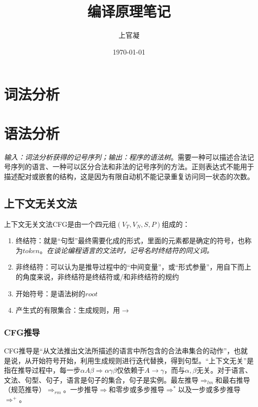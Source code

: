 \documentclass[]{report}
\title{{\huge {编译原理笔记}}}
\author{上官凝}
\date{\today}
\begin{document}
\theoremstyle{definition} \newtheorem{theorem}{Thm}[section] %
\theoremstyle{definition} \newtheorem{definition}{Def}[section] %
\theoremstyle{plain} \newtheorem{lemma}{lemma}[section] %

	\maketitle
	\newpage

	\tableofcontents
	\newpage

	\chapter{词法分析}
	\chapter{语法分析}
	\textit{输入：词法分析获得的记号序列；输出：程序的语法树}。需要一种可以描述合法记号序列的语言、一种可以区分合法和非法的记号序列的方法。正则表达式不能用于描述配对或嵌套的结构，这是因为有限自动机不能记录重复访问同一状态的次数。\par
	\section{上下文无关文法}
		上下文无关文法CFG是由一个四元组$(V_T,V_N,S,P)$组成的：
		\begin{enumerate}
			\item 终结符：就是“句型”最终需要化成的形式，里面的元素都是确定的符号，也称为$token$。\textit{在谈论编程语言的文法时，记号名时终结符的同义词。}
			\item 非终结符：可以认为是推导过程中的“中间变量”，或“形式参量”，用自下而上的角度来说，非终结符是终结符或/和非终结符的规约
			\item 开始符号：是语法树的$root$
			\item 产生式的有限集合：生成规则，用$\to$
		\end{enumerate}
		\subsection{CFG推导}
		CFG推导是“从文法推出文法所描述的语言中所包含的合法串集合的动作”，也就是说，从开始符号开始，利用生成规则进行迭代替换，得到句型。“上下文无关”是指在推导过程中，每一步$\alpha A\beta\Rightarrow\alpha\gamma\beta$仅依赖于$A\to\gamma$，而与$\alpha,\beta$无关。对于语言、文法、句型、句子，语言是句子的集合，句子是实例。最左推导$\Rightarrow_{lm}$和最右推导（规范推导）$\Rightarrow_{rm}$。一步推导$\Rightarrow$和零步或多步推导$\Rightarrow^*$以及一步或多步推导$\Rightarrow^+$。\par
\end{document}
